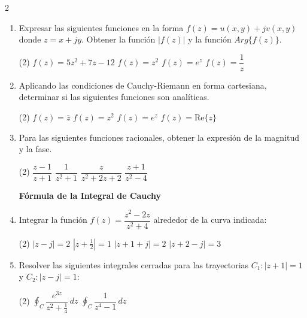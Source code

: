 \documentclass[10pt,a4paper]{article}
\begin{document}
\begin{multicols}{2}
\begin{enumerate}
			\item {Expresar las siguientes funciones en la forma $f(z) =  u(x,y) + j v(x,y)$ 
				\quad donde $z=x+jy$. Obtener la función $|f(z)|$ y la función $Arg \{f(z)\}$.}
			\begin{tasks}(2)
				\task $f(z)=5z^2+7z-12$
				\task $f(z)=z^2$
				\task $f(z)=e^z$
				\task $f(z)=\dfrac{1}{z}$
			\end{tasks}
			
			\item {Aplicando las condiciones de Cauchy-Riemann en forma cartesiana, determinar si las siguientes funciones son analíticas.}
			\begin{tasks}(2)
				\task $f(z)=\bar{z}$
				\task $f(z)=z^2$
				\task $f(z)=e^z$
				\task $f(z)=\mathrm{Re}\{z\}$
			\end{tasks}
			
			\item {Para las siguientes funciones racionales, obtener la expresión de la magnitud y la fase.}
			\begin{tasks}(2)
				\task $\dfrac{z-1}{z+1}$
				\task $\dfrac{1}{z^2+1}$
				\task $\dfrac{z}{z^2+2z+2}$
				\task $\dfrac{z+1}{z^2-4}$
			\end{tasks}
			
			\textbf{Fórmula de la Integral de Cauchy}
			
			\item Integrar la función $f(z)=\dfrac{z^2-2z}{z^2+4}$ alrededor de la curva indicada:
			\begin{tasks}(2)
				\task $|z-j|=2$
				\task $\left| z+\frac{1}{2}\right| =1$
				\task $|z+1+j|=2$
				\task $|z+2-j|=3$
			\end{tasks}
			
			\item {Resolver las siguientes integrales cerradas para las trayectorias $C_1:|z+1|=1$ y $C_2:|z-j|=1$:}
			\begin{tasks}(2)
				\task $\oint_{C}\dfrac{e^{3z}}{z^2+\tfrac{1}{4}}\,dz$
				\task $\oint_{C}\dfrac{1}{z^4-1}\,dz$
			\end{tasks}
			

\end{enumerate}
\end{multicols}
\end{document}
